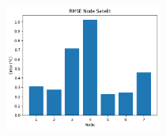 \documentclass[8pt]{beamer}
\begin{document}
\begin{frame}
\begin{columns}[T]
\begin{figure}
      \end{figure}
      \begin{figure}
          \includegraphics[width=0.6\textwidth]{figure/rmse_2018-05-20.png}
      \end{figure}
  \end{columns}
\end{frame}
\end{document}
